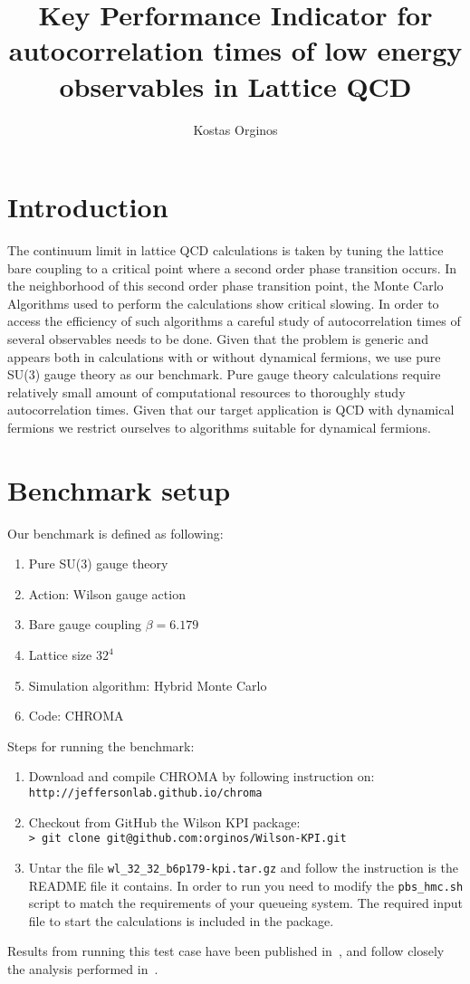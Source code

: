\documentclass[11pt,a4paper]{article}
\title{Key Performance Indicator for autocorrelation times of low energy observables in Lattice QCD}
\author[a,b]{Kostas Orginos}
\affiliation[a]{Physics Department, College of William and Mary,
Williamsburg, Virginia 23187, U.S.A.}
\affiliation[b]{Thomas Jefferson National Accelerator Facility, Newport News, 
Virginia 23606, U.S.A.}
\begin{document}
\maketitle

\section{Introduction}

The continuum limit in lattice QCD calculations is taken by tuning the lattice bare coupling to a  critical point where a second order phase transition occurs. In the neighborhood of this second order phase transition point, the Monte Carlo Algorithms used to perform the calculations show critical slowing. In order to access the efficiency of such algorithms a careful study of autocorrelation times of several observables needs to be done.
Given that the problem is generic and appears both in calculations with or without dynamical fermions,  we use pure SU(3) gauge theory as our benchmark. Pure gauge theory calculations require relatively small amount of computational resources to thoroughly study autocorrelation times. Given that our target application is QCD with dynamical fermions we restrict ourselves to algorithms suitable for dynamical fermions.
 
\section{Benchmark setup}

Our benchmark is defined as following:
\begin{enumerate}
\item Pure SU(3) gauge theory
\item Action: Wilson gauge action
\item Bare gauge coupling $\beta=6.179$
\item Lattice size $32^4$
\item Simulation algorithm: Hybrid Monte Carlo 
\item Code: CHROMA
\end{enumerate}

\noindent
Steps for running the benchmark:
\begin{enumerate}
\item	 Download and compile CHROMA by following instruction on:\\
{\tt http://jeffersonlab.github.io/chroma }
\item Checkout from GitHub the Wilson KPI package:\\
	{\tt > git clone git@github.com:orginos/Wilson-KPI.git}
\item Untar the file {\tt wl\_32\_32\_b6p179-kpi.tar.gz} and follow the instruction is the README file it contains. In order to run you need to modify the {\tt pbs\_hmc.sh} script to match the requirements of your queueing system. The required input file to start the calculations is included in the package.
\end{enumerate}

Results from running this test case have been published in~\cite{Gambhir:2015nda},
and follow closely the analysis performed in~\cite{Schaefer:2010hu}.




\end{document}
